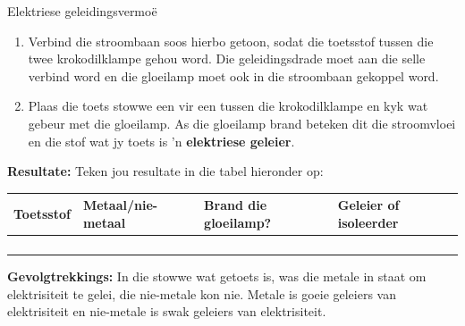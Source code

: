 \begin{g_experiment}{Elektriese geleidingsvermo\"e}
{        \newline
      \label{m38706*id66260}\begin{enumerate}[noitemsep, label=\textbf{\arabic*}. ] 
1. 
2. 
             3. 
            \label{m38706*uid100}\item Verbind die stroombaan soos hierbo getoon, sodat die toetsstof tussen die twee krokodilklampe gehou word. Die geleidingsdrade moet aan die selle verbind word en die gloeilamp moet ook in die stroombaan gekoppel word.
\label{m38706*uid101}\item Plaas die toets stowwe een vir een tussen die krokodilklampe en kyk wat gebeur met die gloeilamp. As die gloeilamp brand beteken dit die stroomvloei en die stof wat jy toets is 'n \textbf{elektriese geleier}.
\end{enumerate}
        \par 
      \label{m38706*id66291}\noindent{}\textbf{Resultate:}
        \newline
        Teken jou resultate in die tabel hieronder op:
          \begin{table}[H]
        \begin{center}
      \label{m38706*id66304}
    \noindent
      \begin{tabular}{|p{2cm}|p{2cm}|p{2cm}|p{2cm}|}\hline
                \textbf{Toetsstof}
               &
                \textbf{Metaal/nie-metaal}
               &
                \textbf{Brand die gloeilamp?}
               &
                \textbf{Geleier of isoleerder}
            \\ \hline
         &
         &
         &
       \\ \hline
         &
         &
         &
       \\ \hline
         &
         &
         &
        \\ \hline
         &
         &
         &
        \\ \hline
    \end{tabular}
      \end{center}
\end{table}
    \par
  \par 
      \label{m38706*id66494}\noindent{}\textbf{Gevolgtrekkings:}
        \newline
        In die stowwe wat getoets is, was die metale in staat om elektrisiteit te gelei, die nie-metale kon nie. Metale is goeie geleiers van elektrisiteit en nie-metale is swak geleiers van elektrisiteit. \par }
            \end{g_experiment}
